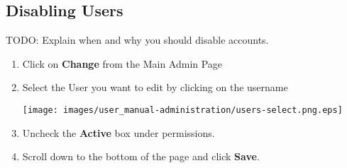 \subsection{Disabling Users}

  TODO: Explain when and why you should disable accounts.

\begin{enumerate}
\item Click on \textbf{Change} from the Main Admin Page
\item Select the User you want to edit by clicking on the username

\texttt{[image: images/user\_manual-administration/users-select.png.eps]}

\item Uncheck the \textbf{Active} box under permissions.
\item Scroll down to the bottom of the page and click \textbf{Save}.
\end{enumerate}

